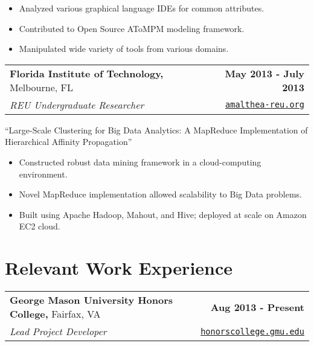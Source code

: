 \documentclass[letterpaper]{article}
\newenvironment{details}
{\begin{itemize}}
{\end{itemize}}
\begin{document}

  \begin{details}
  \item Analyzed various graphical language IDEs for common attributes.
  \item Contributed to Open Source AToMPM modeling framework.
  \item Manipulated wide variety of tools from various domains.
  \end{details}

  \noindent
  \begin{tabularx}{\textwidth}{@{}X r@{}}
    \textbf{Florida Institute of Technology,} Melbourne, FL & \textbf{May 2013 - July 2013} \\
    \emph{REU Undergraduate Researcher} & \texttt{\href{amalthea-reu.org}{amalthea-reu.org}}
  \end{tabularx}

  \noindent\begin{center}``Large-Scale Clustering for Big Data Analytics: A MapReduce Implementation of Hierarchical Affinity Propagation''\end{center}

  \begin{details}
  \item Constructed robust data mining framework in a cloud-computing environment.
  \item Novel MapReduce implementation allowed scalability to Big Data problems.
  \item Built using Apache Hadoop, Mahout, and Hive; deployed at scale on Amazon EC2 cloud.
  \end{details}


  \section{Relevant Work Experience}

  \noindent
  \begin{tabularx}{\textwidth}{@{}X r@{}}
    \textbf{George Mason University Honors College,} Fairfax, VA & \textbf{Aug 2013 - Present} \\
    \emph{Lead Project Developer} & \texttt{\href{http://honorscollege.gmu.edu/collegeresearch}{honorscollege.gmu.edu}}
  \end{tabularx}
\end{document}
